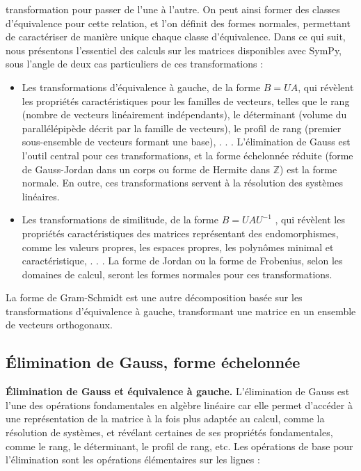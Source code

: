transformation pour passer de l’une à l’autre. On peut ainsi former des classes
d’équivalence pour cette relation, et l’on définit des formes normales, permettant
de caractériser de manière unique chaque classe d’équivalence. Dans ce qui suit,
nous présentons l’essentiel des calculs sur les matrices disponibles avec SymPy, sous
l’angle de deux cas particuliers de ces transformations :

\begin{itemize}
 	 \item Les transformations d’équivalence à gauche, de la forme $B = UA$, qui
révèlent les propriétés caractéristiques pour les familles de vecteurs, telles
que le rang (nombre de vecteurs linéairement indépendants), le déterminant
(volume du parallélépipède décrit par la famille de vecteurs), le profil de rang
(premier sous-ensemble de vecteurs formant une base), . . . L’élimination de
Gauss est l’outil central pour ces transformations, et la forme échelonnée
réduite (forme de Gauss-Jordan dans un corps ou forme de Hermite dans $\mathbb{Z}$)
est la forme normale. En outre, ces transformations servent à la résolution
des systèmes linéaires.
	 \item  Les transformations de similitude, de la forme $B = UAU^{-1}$ , qui révèlent les
propriétés caractéristiques des matrices représentant des endomorphismes,
comme les valeurs propres, les espaces propres, les polynômes minimal et
caractéristique, . . . La forme de Jordan ou la forme de Frobenius, selon les
domaines de calcul, seront les formes normales pour ces transformations.
\end{itemize}

La forme de Gram-Schmidt est une autre décomposition basée sur les transformations d’équivalence à gauche, transformant une matrice en un ensemble de vecteurs orthogonaux.

\subsection{ Élimination de Gauss, forme échelonnée}

\begin{flushleft}
\textbf{Élimination de Gauss et équivalence à gauche.} L’élimination de Gauss est l’une des opérations fondamentales en algèbre linéaire car elle permet d’accéder à une représentation de la matrice à la fois plus adaptée au calcul, comme la résolution de systèmes, et révélant certaines de ses propriétés fondamentales,
comme le rang, le déterminant, le profil de rang, etc. Les opérations de base pour l’élimination sont les opérations élémentaires sur les lignes :
\end{flushleft}

